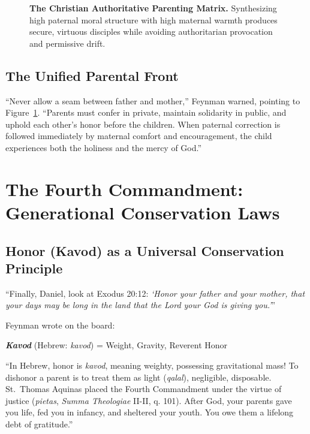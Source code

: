 \documentclass[11pt]{report}
\begin{document}
\begin{figure}[H]
\caption{\textbf{The Christian Authoritative Parenting Matrix.} Synthesizing high paternal moral structure with high maternal warmth produces secure, virtuous disciples while avoiding authoritarian provocation and permissive drift.}
\label{fig:textbook_parenting}
\end{figure}

\section{The Unified Parental Front}
``Never allow a seam between father and mother,'' Feynman warned, pointing to Figure~\ref{fig:textbook_parenting}. ``Parents must confer in private, maintain solidarity in public, and uphold each other's honor before the children. When paternal correction is followed immediately by maternal comfort and encouragement, the child experiences both the holiness and the mercy of God.''

\chapter{The Fourth Commandment: Generational Conservation Laws}

\section{Honor (Kavod) as a Universal Conservation Principle}
``Finally, Daniel, look at Exodus 20:12: \textit{`Honor your father and your mother, that your days may be long in the land that the Lord your God is giving you.'}''

Feynman wrote on the board:
\begin{blackboard}
\centering
\Large \textbf{\textit{Kavod}} (Hebrew: \textit{kavod}) = Weight, Gravity, Reverent Honor
\end{blackboard}

``In Hebrew, honor is \textit{kavod}, meaning weighty, possessing gravitational mass! To dishonor a parent is to treat them as light (\textit{qalal}), negligible, disposable. St.~Thomas Aquinas placed the Fourth Commandment under the virtue of justice (\textit{pietas}, \textit{Summa Theologiae} II-II, q. 101). After God, your parents gave you life, fed you in infancy, and sheltered your youth. You owe them a lifelong debt of gratitude.''
\end{document}
